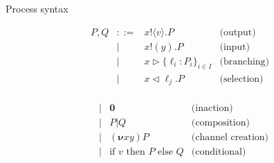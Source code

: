\begin{frame}{Process syntax}
  \begin{center}
    \begin{minipage}{0.48\textwidth}
      $$\begin{array}{lclr}
          P,Q & ::= & x!\langle v\rangle.P                      & \text{(output)}    \\
              & |   & x!(y).P                                   & \text{(input)}     \\
              & |   & x \triangleright \{\ell_i: P_i\}_{i\in I} & \text{(branching)} \\
              & |   & x \triangleleft \ell_j.P                  & \text{(selection)} \\
        \end{array}$$
    \end{minipage}
    \hfill
    \begin{minipage}{0.48\textwidth}
      $$\begin{array}{lclr}
           & | & \mathbf{0}                                   & \text{(inaction)}         \\
           & | & P | Q                                        & \text{(composition)}      \\
           & | & (\bm{\nu} xy)P                               & \text{(channel creation)} \\
           & | & \text{if } v \text{ then } P \text{ else } Q & \text{(conditional)}
        \end{array}$$
    \end{minipage}
  \end{center}

\end{frame}

